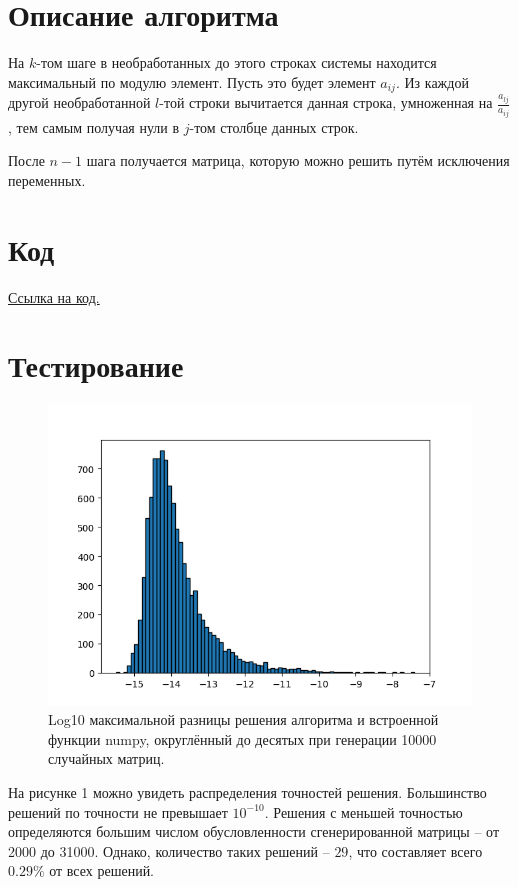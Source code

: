 \section{Описание алгоритма}
    На $k$-том шаге в необработанных до этого строках системы находится максимальный по модулю элемент. Пусть это будет элемент $a_{ij}$. Из каждой другой необработанной $l$-той строки вычитается данная строка, умноженная на $\frac{a_{lj}}{a_{ij}}$, тем самым получая нули в $j$-том столбце данных строк.

    После $n-1$ шага получается матрица, которую можно решить путём исключения переменных.

\section{Код}
    \href{https://github.com/Dezzelshipc/CompMath/blob/main/sem5-compmath/lab2.py}{Ссылка на код.}

\pagebreak

\section{Тестирование}
    \begin{figure}[H]
        \centering
        \includegraphics[width=16cm]{pictures/BarCounts.png}
        \caption{Log10 максимальной разницы решения алгоритма и встроенной функции numpy, округлённый до десятых при генерации 10000 случайных матриц.}
    \end{figure}

    На рисунке 1 можно увидеть распределения точностей решения. Большинство решений по точности не превышает $10^{-10}$. Решения с меньшей точностью определяются большим числом обусловленности сгенерированной матрицы -- от 2000 до 31000. Однако, количество таких решений -- $29$, что составляет всего $0.29 \% $ от всех решений.


